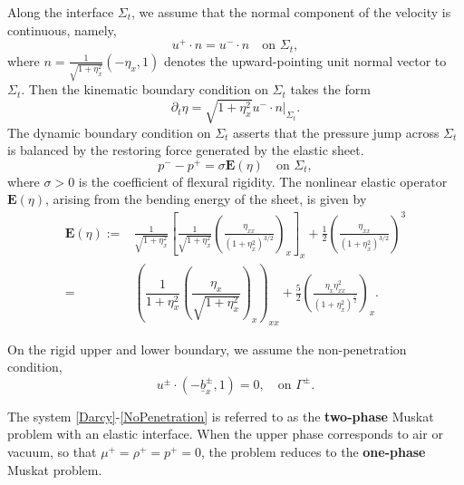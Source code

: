 \documentclass[12pt]{amsart}
\theoremstyle{definition}
\numberwithin{equation}{section}
\newcommand{\p}{\partial}
\newcommand{\f}{\frac}
\begin{document}
Along the interface $\Sigma_t$, we assume that the normal component of the velocity is continuous, namely,
\begin{equation} \label{NormalVelocity}
    u^+ \cdot n = u^- \cdot n \quad \text{on } \Sigma_t, 
\end{equation}
where $n = \frac{1}{\sqrt{1+\eta_x^2}}(-\eta_x, 1)$ denotes the upward-pointing unit normal vector to $\Sigma_t$.
Then the kinematic boundary condition on $\Sigma_t$ takes the form
\begin{equation} \label{kinematic}
    \p_t \eta = \sqrt{1+\eta_x^2} u^- \cdot n\big|_{\Sigma_t}.
\end{equation}
The dynamic boundary condition on $\Sigma_t$ asserts that the pressure jump across $\Sigma_t$ is balanced by the restoring force generated by the elastic sheet.
\begin{equation} \label{dynamic}
   p^- - p^+ = \sigma \mathbf{E}(\eta) \quad \text{on } \Sigma_t, 
\end{equation}
where $\sigma>0$ is the coefficient of flexural rigidity.
The nonlinear elastic operator $\mathbf{E}(\eta)$, arising from the bending energy of the sheet, is given by
\begin{equation} \label{Elastic}
\begin{aligned}
    \mathbf{E}(\eta) :=&\frac{1}{\sqrt{1+\eta_x^2}} 
    \left[ \frac{1}{\sqrt{1+\eta_x^2}} 
    \left( \frac{\eta_{xx}}{(1+\eta_x^2)^{3/2}} \right)_x \right]_x
    + \frac{1}{2} \left( \frac{\eta_{xx}}{(1+\eta_x^2)^{3/2}} \right)^3\\
    =&\left( \dfrac{1}{1+\eta_x^2}\left(\dfrac{\eta_x}{\sqrt{1+\eta_x^2}}\right)_x\right)_{xx}+\f52\left(\f{\eta_x\eta_{xx}^2}{(1+\eta^2_x)^{\f72}}\right)_x.
\end{aligned}
\end{equation}

On the rigid upper and lower boundary, we assume the non-penetration condition,
\begin{equation} \label{NoPenetration}
    u^\pm \cdot (-\underline{b}^\pm_x, 1) = 0, \quad \text{on } \Gamma^\pm.
\end{equation}

The system \eqref{Darcy}-\eqref{NoPenetration} is referred to as the  \textbf{two-phase} Muskat problem with an elastic interface.
When the upper phase corresponds to air or vacuum, so that $\mu^+ = \rho^+ = p^+=0$, the problem reduces to the \textbf{one-phase} Muskat problem.
\end{document}
